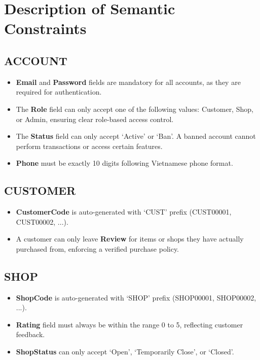 \newpage

\section{Description of Semantic Constraints}

\subsection{ACCOUNT}

\begin{itemize}
    \item \textbf{Email} and \textbf{Password} fields are mandatory for all accounts, as they are required for authentication.
    \item The \textbf{Role} field can only accept one of the following values: Customer, Shop, or Admin, ensuring clear role-based access control.
    \item The \textbf{Status} field can only accept `Active' or `Ban'. A banned account cannot perform transactions or access certain features.
    \item \textbf{Phone} must be exactly 10 digits following Vietnamese phone format.
\end{itemize}

\subsection{CUSTOMER}

\begin{itemize}
    \item \textbf{CustomerCode} is auto-generated with `CUST' prefix (CUST00001, CUST00002, ...).
    \item A customer can only leave \textbf{Review} for items or shops they have actually purchased from, enforcing a verified purchase policy.
\end{itemize}

\subsection{SHOP}

\begin{itemize}
    \item \textbf{ShopCode} is auto-generated with `SHOP' prefix (SHOP00001, SHOP00002, ...).
    \item \textbf{Rating} field must always be within the range 0 to 5, reflecting customer feedback.
    \item \textbf{ShopStatus} can only accept `Open', `Temporarily Close', or `Closed'.
\end{itemize}

